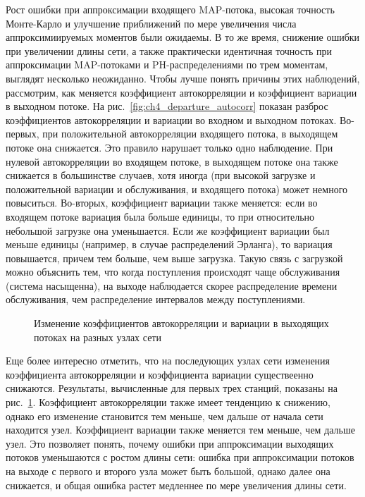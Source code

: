 Рост ошибки при аппроксимации входящего MAP-потока, высокая точность Монте-Карло и улучшение приближений по мере увеличения числа аппроксимиируемых моментов были ожидаемы. В то же время, снижение ошибки при увеличении длины сети, а также практически идентичная точность при аппроксимации MAP-потоками и PH-распределениями по трем моментам, выглядят несколько неожиданно. Чтобы лучше понять причины этих наблюдений, рассмотрим, как меняется коэффициент автокорреляции и коэффициент вариации в выходном потоке. На рис.~\ref{fig:ch4_departure_autocorr} показан разброс коэффициентов автокорреляции и вариации во входном и выходном потоках. Во-первых, при положительной автокорреляции входящего потока, в выходящем потоке она снижается. Это правило нарушает только одно наблюдение. При нулевой автокорреляции во входящем потоке, в выходящем потоке она также снижается в большинстве случаев, хотя иногда (при высокой загрузке и положительной вариации и обслуживания, и входящего потока) может немного повыситься. Во-вторых, коэффициент вариации также меняется: если во входящем потоке вариация была больше единицы, то при относительно небольшой загрузке она уменьшается. Если же коэффициент вариации был меньше единицы (например, в случае распределений Эрланга), то вариация повышается, причем тем больше, чем выше загрузка. Такую связь с загрузкой можно объяснить тем, что когда поступления происходят чаще обслуживания (система насыщенна), на выходе наблюдается скорее распределение времени обслуживания, чем распределение интервалов между поступлениями.

\begin{figure}[h]
  \caption{Изменение коэффициентов автокорреляции и вариации в выходящих потоках на разных узлах сети}
  \label{fig:ch4_net_departure_autocorr}
\end{figure}

Еще более интересно отметить, что на последующих узлах сети изменения коэффициента автокорреляции и коэффициента вариации существеенно снижаются. Результаты, вычисленные для первых трех станций, показаны на рис.~\ref{fig:ch4_net_departure_autocorr}. Коэффициент автокорреляции также имеет тенденцию к снижению, однако его изменение становится тем меньше, чем дальше от начала сети находится узел. Коэффициент вариации также меняется тем меньше, чем дальше узел. Это позволяет понять, почему ошибки при аппроксимации выходящих потоков уменьшаются с ростом длины сети: ошибка при аппроксимации потоков на выходе с первого и второго узла может быть большой, однако далее она снижается, и общая ошибка растет медленнее по мере увеличения длины сети.

